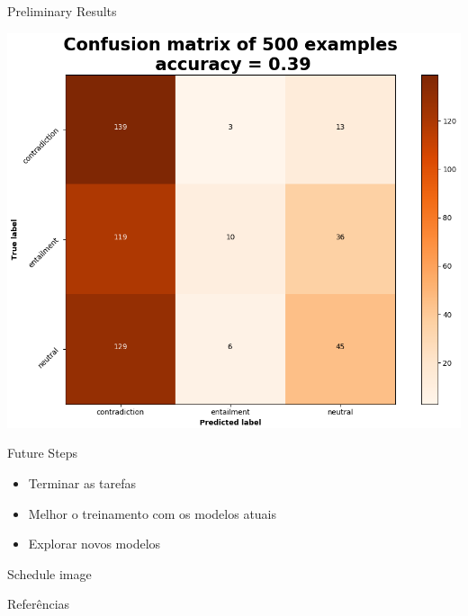 \documentclass[10pt]{beamer}
\begin{document}
\begin{frame}{Preliminary Results}
\begin{center}
\includegraphics[scale=0.42]{images/cm_mem_EntailQA2.png}
\end{center}
\end{frame}


\begin{frame}{Future Steps}
\begin{itemize}

\item Terminar as tarefas

\item Melhor o treinamento com os modelos atuais

\item Explorar novos modelos
\end{itemize}
\end{frame}


\begin{frame}{Schedule}
image
\end{frame}



\begin{frame}[allowframebreaks]{Referências}

  
  

\end{frame}
\end{document}
